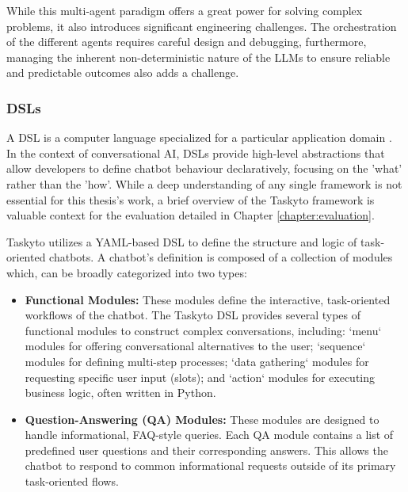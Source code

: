 While this multi-agent paradigm offers a great power for solving complex problems,
it also introduces significant engineering challenges.
The orchestration of the different agents requires careful design and debugging,
furthermore, managing the inherent non-deterministic nature
of the \acp{LLM} to ensure reliable and predictable outcomes also adds a challenge.

\subsubsection{\aclp{DSL}}

A \acl{DSL} is a computer language
specialized for a particular application domain
\autocite{wasowskiDomainSpecificLanguagesEffective2023}.
In the context of conversational AI,
\acp{DSL} provide high-level abstractions
that allow developers to define chatbot behaviour declaratively,
focusing on the 'what' rather than the 'how'.
While a deep understanding of any single framework
is not essential for this thesis's work,
a brief overview of the Taskyto framework
\autocite{sanchezcuadradoAutomatingDevelopmentTaskoriented2024}
is valuable context for the evaluation
detailed in Chapter \ref{chapter:evaluation}.

Taskyto utilizes a YAML-based \ac{DSL}
to define the structure and logic of task-oriented chatbots.
A chatbot's definition is composed of a collection of modules which,
can be broadly categorized into two types:


\begin{itemize}
    \item \textbf{Functional Modules:}
      These modules define the interactive,
      task-oriented workflows of the chatbot.
      The Taskyto DSL provides several types of functional modules
      to construct complex conversations, including:
      `menu` modules for offering conversational alternatives to the user;
      `sequence` modules for defining multi-step processes;
      `data gathering` modules for requesting specific user input (slots);
      and `action` modules for executing business logic, often written in Python.

    \item \textbf{Question-Answering (QA) Modules:}
      These modules are designed to handle informational, FAQ-style queries.
      Each QA module contains
      a list of predefined user questions
      and their corresponding answers.
      This allows the chatbot to respond
      to common informational requests
      outside of its primary task-oriented flows.
\end{itemize}


